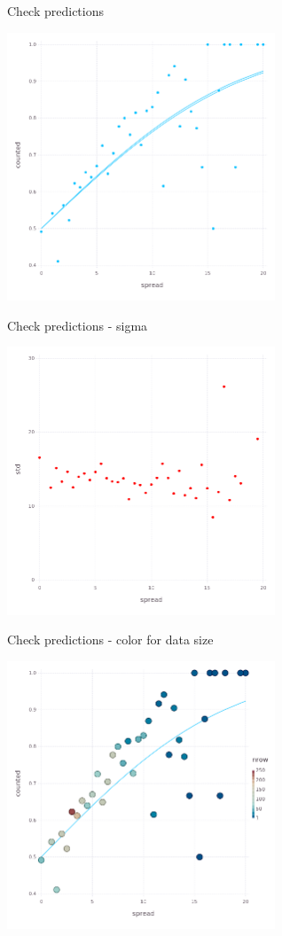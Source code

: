 \documentclass{beamer}
\begin{document}
\begin{frame}{Check predictions}
  \begin{center}
    \includegraphics[width=8cm]{predictionNewSigma.png}
\end{center}
  \end{frame}


\begin{frame}{Check predictions - sigma}
  \begin{center}
    \includegraphics[width=8cm]{sigma.png}
\end{center}
  \end{frame}


\begin{frame}{Check predictions - color for data size}
  \begin{center}
    \includegraphics[width=8cm]{predictionColor.png}
\end{center}
  \end{frame}
\end{document}
